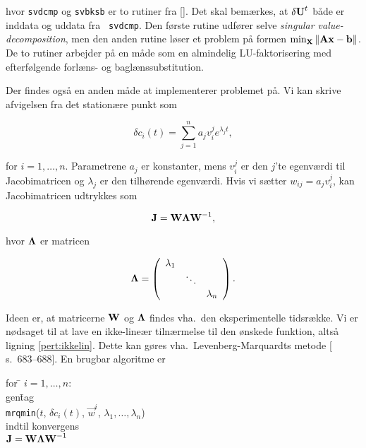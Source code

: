 hvor {\tt svdcmp} og {\tt svbksb} er to rutiner fra
[]. Det skal bem{\ae}rkes, at
$\delta\mbox{${\bf U}$}^t$ b{\aa}de er inddata og uddata fra {\tt
svdcmp}. Den f{\o}rste rutine udf{\o}rer selve {\em
singular value-decomposition}, men den anden rutine
l{\o}ser et problem p{\aa} formen
$\min_{\mbox{${\bf x}$}}\|\mbox{${\bf A}$}\mbox{${\bf x}$}-\mbox{${\bf b}$}\|$. De to
rutiner arbejder p{\aa} en m{\aa}de som en almindelig
LU-faktorisering med efterf{\o}lgende forl{\ae}ns- og
bagl{\ae}nssubstitution.

\vspace{4.0mm}
Der findes ogs{\aa} en anden m{\aa}de at implementerer
problemet p{\aa}. Vi kan skrive afvigelsen fra det
station{\ae}re punkt som

\begin{equation}
  \label{pert:ikkelin}
  \delta c_i(t) = \sum_{j=1}^n a_jv_i^je^{\lambda_j t},
\end{equation}

for $i=1,\ldots,n$. Parametrene $a_j$ er konstanter, mens
$v_i^j$ er den $j$'te egenv{\ae}rdi til Jacobimatricen og
$\lambda_j$ er den tilh{\o}rende egenv{\ae}rdi. Hvis vi
s{\ae}tter $w_{ij} = a_jv_i^j$, kan Jacobimatricen
udtrykkes som

\begin{equation}
  \mbox{${\bf J}$} = \mbox{${\bf W}$}\mbox{${\bf \Lambda}$}\mbox{${\bf W}$}^{-1},
\end{equation}

hvor $\mbox{${\bf \Lambda}$}$ er matricen

\[
  \mbox{${\bf \Lambda}$} = \left(
  \begin{array}{ccc}
    \lambda_1 & & \\
     & \ddots &  \\
     & & \lambda_n 
  \end{array}
  \right).
\]

Ideen er, at matricerne $\mbox{${\bf W}$}$ og $\mbox{${\bf \Lambda}$}$
findes vha.\ den eksperimentelle tidsr{\ae}kke. Vi er
n{\o}dsaget til at lave en ikke-line{\ae}r tiln{\ae}rmelse
til den {\o}nskede funktion, alts{\aa} ligning
\ref{pert:ikkelin}. Dette kan g{\o}res vha.\ Levenberg-Marquardts
metode [ s.\ 683--688]. En brugbar algoritme er

\begin{tabbing}
for \= $i=1,\ldots,n$: \\
\> gen\= tag  \\
\>\> {\tt mrqmin}($t$, $\delta c_i(t)$, $\vec{w}^i$,
$\lambda_1,\ldots,\lambda_n$) \\
\> indtil konvergens \\
$\mbox{${\bf J}$}=\mbox{${\bf W}$}\mbox{${\bf \Lambda}$}\mbox{${\bf W}$}^{-1}$
\end{tabbing}


